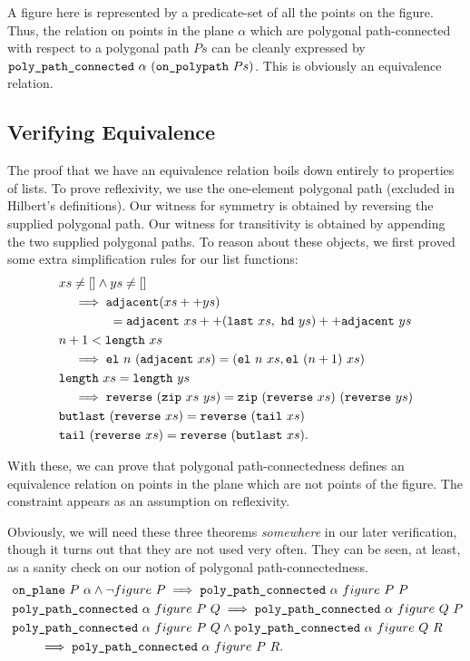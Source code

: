 A figure here is represented by a predicate-set of all the points on the figure. Thus, the relation on points in the plane $\alpha$ which are polygonal path-connected with respect to a polygonal path $Ps$ can be cleanly expressed by $\code{poly\_path\_connected}\ \alpha\ (\code{on\_polypath}\ Ps)$. This is obviously an equivalence relation.

\subsection{Verifying Equivalence}\label{sec:segConnectEquivalence}
The proof that we have an equivalence relation boils down entirely to properties of lists. To prove reflexivity, we use the one-element polygonal path (excluded in Hilbert's definitions). Our witness for symmetry is obtained by reversing the supplied polygonal path. Our witness for transitivity is obtained by appending the two supplied polygonal paths. To reason about these objects, we first proved some extra simplification rules for our list functions:
\begin{align*}
  &xs \neq [] \wedge ys \neq []\\ 
  &\quad\implies\code{adjacent}(\append{xs}{ys})\\
  &\qquad\qquad = \append{\append{\code{adjacent}\ xs}{(\code{last}\ xs,\ \code{hd}\ ys)}}{\code{adjacent}\ ys}\\
  &n + 1 < \code{length}\ xs\\
  &\quad\implies \el{n}{(\code{adjacent}\ xs)} = (\el{n}{xs}, \el{(n+1)}{xs})\\
  &\code{length}\ xs = \code{length}\ ys\\
  &\quad\implies\code{reverse}\ (\code{zip}\ xs\ ys) = \code{zip}\ (\code{reverse}\ xs)\ (\code{reverse}\ ys)\\
  &\code{butlast}\ (\code{reverse}\ xs) = \code{reverse}\ (\code{tail}\ xs)\\
  &\code{tail}\ (\code{reverse}\ xs) = \code{reverse}\ (\code{butlast}\ xs).
\end{align*}

With these, we can prove that polygonal path-connectedness defines an equivalence relation on points in the plane which are not points of the figure. The constraint appears as an assumption on reflexivity. 

Obviously, we will need these three theorems \emph{somewhere} in our later verification, though it turns out that they are not used very often. They can be seen, at least, as a sanity check on our notion of polygonal path-connectedness.
\begin{align*}
  \;&\code{on\_plane}\ P\ \alpha \wedge \neg figure\ P \implies \code{poly\_path\_connected}\ \alpha\ figure\ P\ P\\
  \;&\code{poly\_path\_connected}\ \alpha\ figure\ P\ Q \implies \code{poly\_path\_connected}\ \alpha\ figure\ Q\ P\\
  \;&\code{poly\_path\_connected}\ \alpha\ figure\ P\ Q \wedge \code{poly\_path\_connected}\ \alpha\ figure\ Q\ R\\
  &\qquad\implies \code{poly\_path\_connected}\ \alpha\ figure\ P\ R.
\end{align*}

